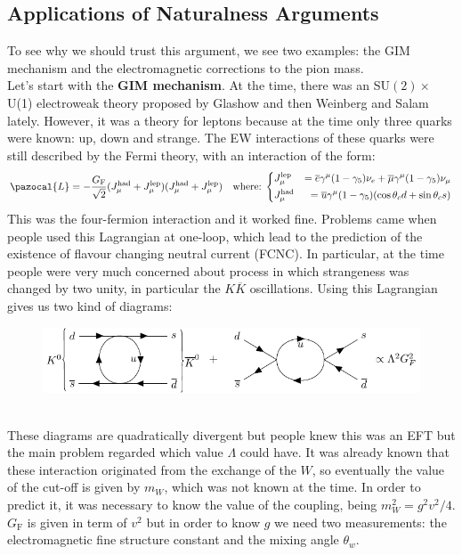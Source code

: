 \documentclass[../main.tex]{subfiles}
\begin{document}
\subsection{Applications of Naturalness Arguments}
To see why we should trust this argument, we see two examples: the GIM mechanism and the electromagnetic corrections to the pion mass.\\
Let's start with the \textbf{GIM mechanism}. At the time, there was an SU$(2)\times$U(1) electroweak theory proposed by Glashow and then Weinberg and Salam lately. However, it was a theory for leptons because at the time only three quarks were known: up, down and strange. The EW interactions of these quarks were still described by the Fermi theory, with an interaction of the form:
\[
\pazocal{L}=-\frac{G_{\text{F}}}{\sqrt{2}}(J_\mu^{\text{had}}+J_\mu^{\text{lep}})(J_\mu^{\text{had}}+J_\mu^{\text{lep}}) \quad \text{where:}\;\left\{
\begin{aligned}
&J_\mu^{\text{lep}}&=\overline{e}\gamma^\mu(1-\gamma_5)\nu_e+\overline{\mu}\gamma^\mu(1-\gamma_5)\nu_\mu\\
&J_\mu^{\text{had}}&=\overline{u}\gamma^\mu(1-\gamma_5)(\cos\theta_cd+\sin\theta_cs)
\end{aligned}
\right.
\]
This was the four-fermion interaction and it worked fine. Problems came when people used this Lagrangian at one-loop, which lead to the prediction of the existence of flavour changing neutral current (FCNC). In particular, at the time people were very much concerned about process in which strangeness was changed by two unity, in particular the $K\overline{K}$ oscillations. Using this Lagrangian gives us two kind of diagrams:
\begin{figure}[h]
    \centering
    \includegraphics{Images/kk.pdf}
    \caption*{}
\end{figure}\\
These diagrams are quadratically divergent but people knew this was an EFT but the main problem regarded which value $\Lambda$ could have. It was already known that these interaction originated from the exchange of the $W$, so eventually the value of the cut-off is given by $m_W$, which was not known at the time. In order to predict it, it was necessary to know the value of the coupling, being $m_W^2=g^2v^2/4$. $G_{\text{F}}$ is given in term of $v^2$ but in order to know $g$ we need two measurements: the electromagnetic fine structure constant and the mixing angle $\theta_w$. 
\end{document}
